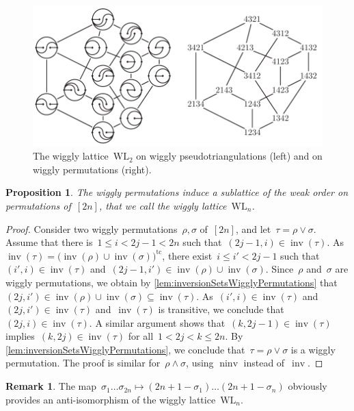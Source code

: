 \documentclass{amsart}
\newtheorem{proposition}[theorem]{Proposition}
\theoremstyle{definition}
\newtheorem{remark}[theorem]{Remark}
\DeclareMathOperator{\inv}{inv} %
\DeclareMathOperator{\ninv}{ninv} %
\newcommand{\darkblue}{\color{darkblue}} %
\newcommand{\defn}[1]{\textsl{\darkblue #1}} %
\newcommand{\meet}{\wedge} %
\newcommand{\join}{\vee} %
\newcommand{\wigglyLattice}{\mathrm{WL}} %
\begin{document}
%
\begin{figure}
\centerline{\includegraphics[scale=1.1]{wigglyFlipGraph}}
\caption{The wiggly lattice~$\wigglyLattice_2$ on wiggly pseudotriangulations (left) and on wiggly permutations (right).}
\label{fig:wigglyLattice}
\end{figure}

\begin{proposition}
The wiggly permutations induce a sublattice of the weak order on permutations of~$[2n]$, that we call the \defn{wiggly lattice}~$\wigglyLattice_n$.
\end{proposition}

\begin{proof}
Consider two wiggly permutations~$\rho, \sigma$ of~$[2n]$, and let~$\tau = \rho \join \sigma$.
Assume that there is~$1 \le i < 2j-1 < 2n$ such that~$(2j-1, i) \in \inv(\tau)$.
As $\inv(\tau) = \big( \inv(\rho) \cup \inv(\sigma) \big)^\textrm{tc}$, there exist~$i \le i' < 2j-1$ such that~$(i', i) \in \inv(\tau)$ and~$(2j-1, i') \in \inv(\rho) \cup \inv(\sigma)$.
Since~$\rho$ and~$\sigma$ are wiggly permutations, we obtain by \cref{lem:inversionSetsWigglyPermutations} that~$(2j, i') \in \inv(\rho) \cup \inv(\sigma) \subseteq \inv(\tau)$.
As~$(i', i) \in \inv(\tau)$ and~$(2j, i') \in \inv(\tau)$ and~$\inv(\tau)$ is transitive, we conclude that~$(2j,i) \in \inv(\tau)$.
A similar argument shows that~$(k, 2j-1) \in \inv(\tau)$ implies~$(k, 2j) \in \inv(\tau)$ for all~$1 < 2j < k \le 2n$.
By \cref{lem:inversionSetsWigglyPermutations}, we conclude that~$\tau = \rho \join \sigma$ is a wiggly permutation.
The proof is similar for~$\rho \meet \sigma$, using $\ninv$ instead of~$\inv$.
\end{proof}

\begin{remark}
\label{rem:wigglyLatticeAntiIsomorphism}
The map~$\sigma_1 \dots \sigma_{2n} \mapsto (2n+1-\sigma_1) \dots (2n+1-\sigma_n)$ obviously provides an anti-isomorphism of the wiggly lattice~$\wigglyLattice_n$.
\end{remark}
\end{document}
